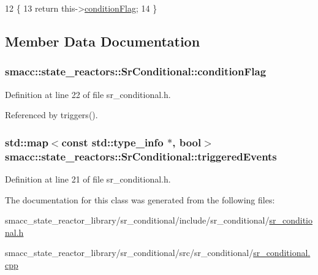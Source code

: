 \begin{DoxyCode}
12 \{
13     \textcolor{keywordflow}{return} this->\hyperlink{classsmacc_1_1state__reactors_1_1SrConditional_a3642c78c02f02ed8eb0e5a41240f445c}{conditionFlag};
14 \}
\end{DoxyCode}


\subsection{Member Data Documentation}
\subsubsection[{\texorpdfstring{condition\+Flag}{conditionFlag}}]{ smacc\+::state\+\_\+reactors\+::\+Sr\+Conditional\+::condition\+Flag\hspace{0.3cm}{\ttfamily [private]}}\hypertarget{classsmacc_1_1state__reactors_1_1SrConditional_a3642c78c02f02ed8eb0e5a41240f445c}{}\label{classsmacc_1_1state__reactors_1_1SrConditional_a3642c78c02f02ed8eb0e5a41240f445c}


Definition at line 22 of file sr\+\_\+conditional.\+h.



Referenced by triggers().

\subsubsection[{\texorpdfstring{triggered\+Events}{triggeredEvents}}]{\setlength{\rightskip}{0pt plus 5cm}std\+::map$<$const std\+::type\+\_\+info $\ast$, {\bf bool}$>$ smacc\+::state\+\_\+reactors\+::\+Sr\+Conditional\+::triggered\+Events\hspace{0.3cm}{\ttfamily [private]}}\hypertarget{classsmacc_1_1state__reactors_1_1SrConditional_a6d841c624d6f6875db2ab6c6314bc3e1}{}\label{classsmacc_1_1state__reactors_1_1SrConditional_a6d841c624d6f6875db2ab6c6314bc3e1}


Definition at line 21 of file sr\+\_\+conditional.\+h.



The documentation for this class was generated from the following files\+:\begin{DoxyCompactItemize}
\item 
smacc\+\_\+state\+\_\+reactor\+\_\+library/sr\+\_\+conditional/include/sr\+\_\+conditional/\hyperlink{sr__conditional_8h}{sr\+\_\+conditional.\+h}\item 
smacc\+\_\+state\+\_\+reactor\+\_\+library/sr\+\_\+conditional/src/sr\+\_\+conditional/\hyperlink{sr__conditional_8cpp}{sr\+\_\+conditional.\+cpp}\end{DoxyCompactItemize}
